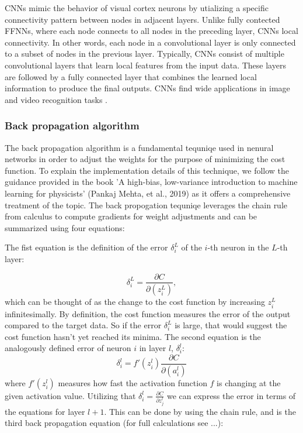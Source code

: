 \documentclass[a4paper, UKenglish, 11pt]{uiomaster}
\begin{document}
CNNs mimic the behavior of visual cortex neurons by utializing a specific connectivity pattern between nodes in adjacent layers. Unlike fully contected FFNNs, where each node connects to all nodes in the preceding layer, CNNs  local connectivity. In other words, each node in a convolutional layer is only connected to a subset of nodes in the previous layer. Typically, CNNs consist of multiple convolutional layers that learn local features from the input data. These layers are followed by a fully connected layer that combines the learned local information to produce the final outputs. CNNs find wide applications in image and video recognition tasks \cite{Hjorth-Jensen2022}.


\subsubsection{Back propagation algorithm}
The back propagation algorithm is a fundamental tequniqe used in nenural networks in order to adjust the weights for the purpose of minimizing the cost function. To explain the implementation details of this technique, we follow the guidance provided in the book 'A high-bias, low-variance introduction to machine learning for physicists' (Pankaj Mehta, et al., 2019) as it offers a comprehensive treatment of the topic. The back propogation tequniqe leverages the chain rule from calculus to compute gradients for weight adjustments and can be summarized using four equations:


The fist equation is the definition of the error $\delta_i^L$ of the $i$-th neuron in the $L$-th layer:

\begin{equation}
    \delta_i^L = \frac{\partial C}{\partial(z_i^L)},
\label{eq:I}
\end{equation}
which can be thought of as the change to the cost function by increasing $z_i^L$ infinitesimally. By definition, the cost function measures the error of the output compared to the target data. So if the error $\delta_i^L$ is large, that would suggest the cost function hasn't yet reached its minima.
The second equation is the analogously defined error of neuron $i$ in layer $l$, $\delta_i^l$:
\begin{equation}
    \delta_i^l = f'(z_i^l)\frac{\partial C}{\partial(a_i^l)}
\label{eq:II}
\end{equation}
where $f'(z_i^l)$ measures how fast the activation function $f$ is changing at the given activation value.
Utilizing that $\delta_i^l = \frac{\partial C}{\partial z_j^l}$ we can express the error in terms of the equations for layer $l+1$. This can be done by using the chain rule, and is the third back propagation equation (for full calculations see ...):
\end{document}
